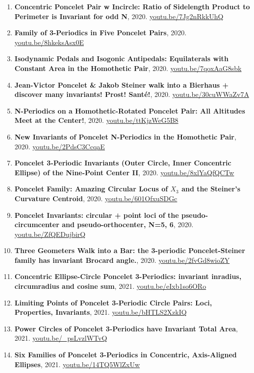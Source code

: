 \documentclass[12pt]{article}
\begin{document}
\begin{enumerate}[resume]
\item \textbf{Concentric Poncelet Pair w Incircle: Ratio of Sidelength Product to Perimeter is Invariant for odd N}, 2020. \href{https://youtu.be/7Jg2nRkkUhQ}{\url{youtu.be/7Jg2nRkkUhQ}}
\item \textbf{Family of 3-Periodics in Five Poncelet Pairs}, 2020. \href{https://youtu.be/8hkeksAsx0E}{\url{youtu.be/8hkeksAsx0E}}
\item \textbf{Isodynamic Pedals and Isogonic Antipedals: Equilaterals with Constant Area in the Homothetic Pair}, 2020. \href{https://youtu.be/7qoxAaG8sbk}{\url{youtu.be/7qoxAaG8sbk}}
\item \textbf{Jean-Victor Poncelet \& Jakob Steiner walk into a Bierhaus + discover many invariants! Prost! Santé!}, 2020. \href{https://youtu.be/30cuWWaZv7A}{\url{youtu.be/30cuWWaZv7A}}
\item \textbf{N-Periodics on a Homothetic-Rotated Poncelet Pair: All Altitudes Meet at the Center!}, 2020. \href{https://youtu.be/ttKjzWeG5B8}{\url{youtu.be/ttKjzWeG5B8}}
\item \textbf{New Invariants of Poncelet N-Periodics in the Homothetic Pair}, 2020. \href{https://youtu.be/2PdsC3CcqaE}{\url{youtu.be/2PdsC3CcqaE}}
\item \textbf{Poncelet 3-Periodic Invariants (Outer Circle, Inner Concentric Ellipse) of the Nine-Point Center II}, 2020. \href{https://youtu.be/8xlYaQfQCTw}{\url{youtu.be/8xlYaQfQCTw}}
\item \textbf{Poncelet Family: Amazing Circular Locus of $X_{3}$ and the Steiner's Curvature Centroid}, 2020. \href{https://youtu.be/601OfxuSDGc}{\url{youtu.be/601OfxuSDGc}}
\item \textbf{Poncelet Invariants:
circular + point loci of the pseudo-circumcenter and pseudo-orthocenter, N=5, 6}, 2020. \href{https://youtu.be/ZfQEDujbirQ}{\url{youtu.be/ZfQEDujbirQ}}
\item \textbf{Three Geometers Walk into a Bar: the 3-periodic Poncelet-Steiner family has invariant Brocard angle.}, 2020. \href{https://youtu.be/2fvGd8wioZY}{\url{youtu.be/2fvGd8wioZY}}
\item \textbf{Concentric Ellipse-Circle Poncelet 3-Periodics: invariant inradius, circumradius and cosine sum}, 2021. \href{https://youtu.be/eIxb1so6ORo}{\url{youtu.be/eIxb1so6ORo}}
\item \textbf{Limiting Points of Poncelet 3-Periodic Circle Pairs: Loci, Properties, Invariants}, 2021. \href{https://youtu.be/bHTLS2XzkIQ}{\url{youtu.be/bHTLS2XzkIQ}}
\item \textbf{Power Circles of Poncelet 3-Periodics have Invariant Total Area}, 2021. \href{https://youtu.be/_psLvzlWTvQ}{\url{youtu.be/\_psLvzlWTvQ}}
\item \textbf{Six Families of Poncelet 3-Periodics in Concentric, Axis-Aligned Ellipses}, 2021. \href{https://youtu.be/14TQ5WlZxUw}{\url{youtu.be/14TQ5WlZxUw}}
\end{enumerate}
\end{document}
